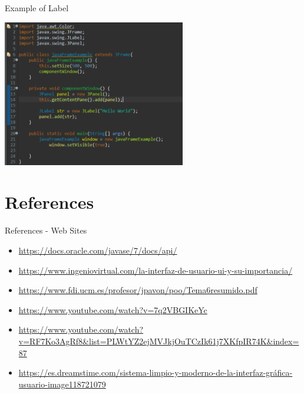 \documentclass[11pt]{beamer}
\begin{document}
	\begin{frame}{Example of Label}
		\begin{center}
			\includegraphics[width=8cm]{images/example3}
		\end{center}
	\end{frame}
	
	\section{References}
	\begin{frame}{References - Web Sites}
		\begin{itemize}
			\item \url{https://docs.oracle.com/javase/7/docs/api/}
			\item \url{https://www.ingeniovirtual.com/la-interfaz-de-usuario-ui-y-su-importancia/}
			\item \url{https://www.fdi.ucm.es/profesor/jpavon/poo/Tema6resumido.pdf}
			\item \url{https://www.youtube.com/watch?v=7q2VBGIKeYc}
			\item \url{https://www.youtube.com/watch?v=RF7Ko3AgRf8&list=PLWtYZ2ejMVJkjOuTCzIk61j7XKfpIR74K&index=87}
			\item \url{https://es.dreamstime.com/sistema-limpio-y-moderno-de-la-interfaz-gráfica-usuario-image118721079}
		\end{itemize}
	\end{frame}
\end{document}
